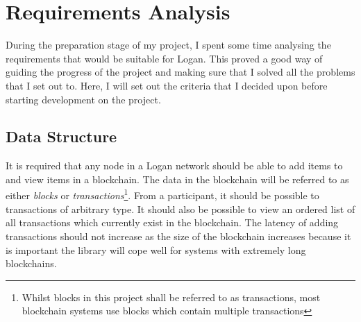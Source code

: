 \documentclass[12pt,a4paper,twoside,openright]{report}
\begin{document}
	\section{Requirements Analysis} \label{Requirements Analysis}
	During the preparation stage of my project, I spent some time analysing the requirements that would be suitable for Logan. 
	This proved a good way of guiding the progress of the project and making sure that I solved all the problems that I set out to. 
	Here, I will set out the criteria that I decided upon before starting development on the project.
	\subsection{Data Structure}
	It is required that any node in a Logan network should be able to add items to and view items in a blockchain. 
	The data in the blockchain will be referred to as either \textit{blocks} or \textit{transactions}\footnote{Whilst blocks in this project shall be referred to as transactions, most blockchain systems use blocks which contain multiple transactions}. 
	From a participant, it should be possible to transactions of arbitrary type. 
	It should also be possible to view an ordered list of all transactions which currently exist in the blockchain.
	The latency of adding transactions should not increase as the size of the blockchain increases because it is important the library will cope well for systems with extremely long blockchains.\\
\end{document}
